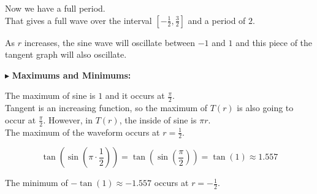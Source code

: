 \documentclass{ximera}
\begin{document}
Now we have a full period. \\



That gives a full wave over the interval $\left[-\frac{1}{2}, \frac{3}{2}\right]$ and a period of $2$.



As $r$ increases, the sine wave will oscillate between $-1$ and $1$ and this piece of the tangent graph will also oscillate.  






\begin{image}
\end{image}




$\blacktriangleright$ \textbf{\textcolor{blue!55!black}{Maximums and Minimums: }}



The maximum of sine is $1$ and it occurs at $\frac{\pi}{2}$.\\

Tangent is an increasing function, so the maximum of $T(r)$ is also going to occur at $\frac{\pi}{2}$. However, in $T(r)$, the inside of sine is $\pi r$.\\


The maximum of the waveform occurs at $r = \frac{1}{2}$.


\[   \tan\left(\sin\left(\pi \cdot \frac{1}{2}\right)\right)  =   \tan\left(\sin\left(\frac{\pi}{2}\right)\right)  = \tan(1)  \approx 1.557  \]


The minimum of $-\tan(1) \approx -1.557$ occurs at $r = -\frac{1}{2}$.
\end{document}
